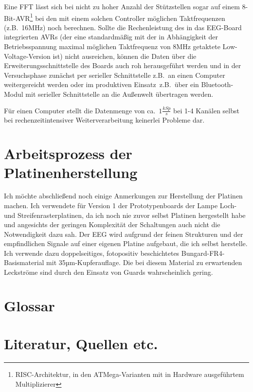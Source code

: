 \documentclass[12pt,a4paper,notitlepage]{article}
\begin{document}
Eine FFT lässt sich bei nicht zu hoher Anzahl der Stützstellen sogar auf einem 8-Bit-AVR\footnote{RISC-Architektur, in den \glqq ATMega\grqq-Varianten mit in Hardware ausgeführtem Multiplizierer} bei den mit einem solchen Controller möglichen Taktfrequenzen (z.B.\ 16MHz) noch berechnen\cite{LOMBARD1}. Sollte die Rechenleistung des in das EEG-Board integrierten AVRs (der eine standardmäßig mit der in Abhängigkeit der Betriebsspannung maximal möglichen Taktfrequenz von 8MHz getaktete Low-Voltage-Version ist) nicht ausreichen, können die Daten über die Erweiterungsschnittstelle des Boards auch roh herausgeführt werden und in der Versuchsphase zunächst per serieller Schnittstelle z.B.\ an einen Computer weitergereicht werden oder im \glqq produktiven Einsatz\grqq\ z.B.\ über ein Bluetooth-Modul mit serieller Schnittstelle an die Außenwelt übertragen werden.

Für einen Computer stellt die Datenmenge von ca.\ $1\frac{kSp}{s}$ bei 1-4 Kanälen selbst bei rechenzeitintensiver Weiterverarbeitung keinerlei Probleme dar.

\section{Arbeitsprozess der Platinenherstellung}
Ich möchte abschließend noch einige Anmerkungen zur Herstellung der Platinen machen. Ich verwendete für Version 1 der Prototypenboards der Lampe Loch- und Streifenrasterplatinen, da ich noch nie zuvor selbst Platinen hergestellt habe und angesichts der geringen Komplexität der Schaltungen auch nicht die Notwendigkeit dazu sah. Der EEG wird aufgrund der feinen Strukturen und der empfindlichen Signale auf einer eigenen Platine aufgebaut, die ich selbst herstelle. Ich verwende dazu doppelseitiges, fotopositiv beschichtetes Bungard-FR4-Basismaterial mit 35µm-Kupferauflage. Die bei diesem Material zu erwartenden Leckströme sind durch den Einsatz von Guards wahrscheinlich gering\cite{BUNGARD1,ANALOG1,ANALOG2,MAXIM56,MAXIM55,MAXIM52}.
\appendix
\section{Glossar}
\glsaddall
\printglossary[type=\acronymtype,title={Abkürzungen}]
\printglossary[title={Begriffserklärungen}]
\section{Literatur, Quellen etc.}
\nocite{STELTZ1}
\nocite{TEXAS2,TEXAS3,TEXAS4,TEXAS5,TEXAS6,TEXAS7,TEXAS8,TEXAS9}
\nocite{MAXIM46,MAXIM48}
\nocite{MAXIM75,MAXIM73,MAXIM72,MAXIM71,MAXIM69,MAXIM68,MAXIM67,MAXIM66,MAXIM65,MAXIM62,MAXIM57,MAXIM54,MAXIM53,MAXIM51,MAXIM47}
\nocite{MAXIM50}

\renewcommand{\refname}{}

\end{document}
